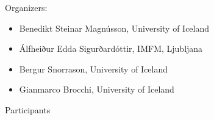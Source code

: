 \documentclass[12pt,openany]{report}      %
\begin{document}
\vfill
\vfill
\noindent
Organizers:
\begin{itemize}
    \setlength\itemsep{-0.3 em}
    \item Benedikt Steinar Magnússon, University of Iceland
    \item Álfheiður Edda Sigurðardóttir, IMFM, Ljubljana
    \item Bergur Snorrason, University of Iceland
    \item Gianmarco Brocchi, University of Iceland
\end{itemize}
\vfill

\pagebreak

\newcommand\talk[3]{%
    \vspace{3 ex}
    \noindent
    \textsc{\large #1}

    \smallskip
    \noindent
    \textbf{\textit{#2}}

    \medskip
    \noindent
    #3

}




\pagebreak



\pagebreak





\newpage
{}

\noindent
{\LARGE Participants}
\end{document}
